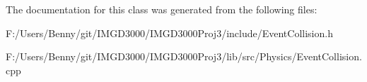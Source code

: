 The documentation for this class was generated from the following files\+:\begin{DoxyCompactItemize}
\item 
F\+:/\+Users/\+Benny/git/\+I\+M\+G\+D3000/\+I\+M\+G\+D3000\+Proj3/include/Event\+Collision.\+h\item 
F\+:/\+Users/\+Benny/git/\+I\+M\+G\+D3000/\+I\+M\+G\+D3000\+Proj3/lib/src/\+Physics/Event\+Collision.\+cpp\end{DoxyCompactItemize}
